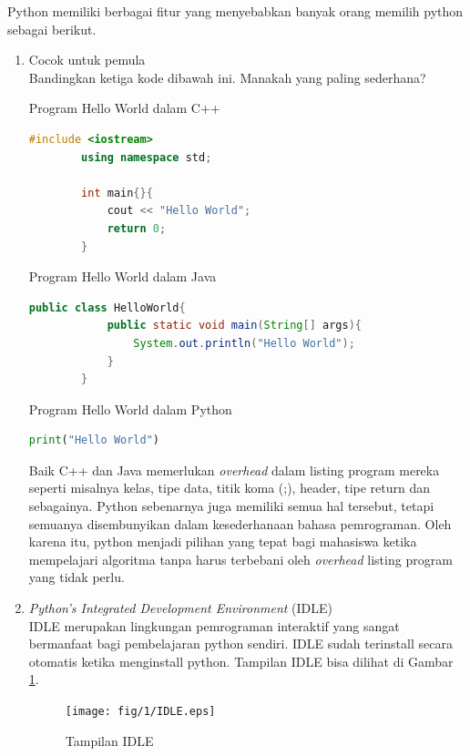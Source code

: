 Python memiliki berbagai fitur yang menyebabkan banyak orang memilih python sebagai berikut.
\begin{enumerate}
	\item Cocok untuk pemula
	\\Bandingkan ketiga kode dibawah ini. Manakah yang paling sederhana? 
	\begin{listprog}{Program Hello World dalam C++}
		\label{lst:helloWorldC++}
		\begin{lstlisting}[language=C++]
		#include <iostream>
		using namespace std;
		
		int main{}{
			cout << "Hello World";
			return 0;
		}
		\end{lstlisting}
	\end{listprog}
	\begin{listprog}{Program Hello World dalam Java}
		\label{lst:helloWorldJava}
		\begin{lstlisting}[language=Java]
		public class HelloWorld{
			public static void main(String[] args){
				System.out.println("Hello World");
			}
		}
		\end{lstlisting}
	\end{listprog}
	\begin{listprog}{Program Hello World dalam Python}
		\label{lst:helloWorldPython}
		\begin{lstlisting}[language=Python]
		print("Hello World")
		\end{lstlisting}
	\end{listprog}
	Baik C++ dan Java memerlukan \textit{overhead} dalam listing program mereka seperti misalnya kelas, tipe data, titik koma (;), header, tipe return dan sebagainya. Python sebenarnya juga memiliki semua hal tersebut, tetapi semuanya disembunyikan dalam kesederhanaan bahasa pemrograman. Oleh karena itu, python menjadi pilihan yang tepat bagi mahasiswa ketika mempelajari algoritma tanpa harus terbebani oleh \textit{overhead} listing program yang tidak perlu.
	\item \textit{Python's Integrated Development Environment} (IDLE)
	\\IDLE merupakan lingkungan pemrograman interaktif yang sangat bermanfaat bagi pembelajaran python sendiri. IDLE sudah terinstall secara otomatis ketika menginstall python. Tampilan IDLE bisa dilihat di Gambar \ref{fig:IDLE}. 
	
\begin{figure}
	\centering
		\texttt{[image: fig/1/IDLE.eps]}
	\caption{Tampilan IDLE}
	\label{fig:IDLE}
\end{figure}


\end{enumerate}
